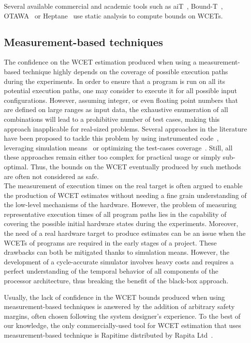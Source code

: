 \documentclass[main.tex]{subfiles}
\begin{document}
Several available commercial and academic tools such as aiT~\cite{aiT},
Bound-T~\cite{BoundT}, OTAWA~\cite{Otawa} or Heptane~\cite{Heptane} use static
analysis to compute bounds on WCETs.


\subsection{Measurement-based techniques}
The confidence on the WCET estimation produced when using a measurement-based
technique highly depends on the coverage of possible execution paths during the
experiments. In order to ensure that a program is run on all its potential
execution paths, one may consider to execute it for all possible input
configurations. However, assuming integer, or even floating point numbers that
are defined on large ranges as input data, the exhaustive enumeration of all
combinations will lead to a prohibitive number of test cases, making this
approach inapplicable for real-sized problems. Several approaches in the
literature have been proposed to tackle this problem by using instrumented
code~\cite{Williams2005}, leveraging simulation means~\cite{Lundqvist1999_rts}
or optimizing the test-cases coverage~\cite{Law2016}. Still, all these
approaches remain either too complex for practical usage or simply sub-optimal.
Thus, the bounds on the WCET eventually produced by such methods are often not
considered as safe. \\

The measurement of execution times on the real target is often argued to enable
the production of WCET estimates without needing a fine grain understanding of
the low-level mechanisms of the hardware. However, the problem of measuring
representative execution times of all program paths lies in the capability of
covering the possible initial hardware states during the experiments. Moreover,
the need of a real hardware target to produce estimates can be an issue when
the WCETs of programs are required in the early stages of a project. These
drawbacks can both be mitigated thanks to simulation means. However, the
development of a cycle-accurate simulator involves heavy costs and requires a
perfect understanding of the temporal behavior of all components of the
processor architecture, thus breaking the benefit of the black-box approach.

Usually, the lack of confidence in the WCET bounds produced when using
measurement-based techniques is answered by the addition of arbitrary safety
margins, often chosen following the system designer's experience.  To the best
of our knowledge, the only commercially-used tool for WCET estimation that uses
measurement-based technique is Rapitime distributed by Rapita
Ltd~\cite{Rapitime}.
\end{document}
